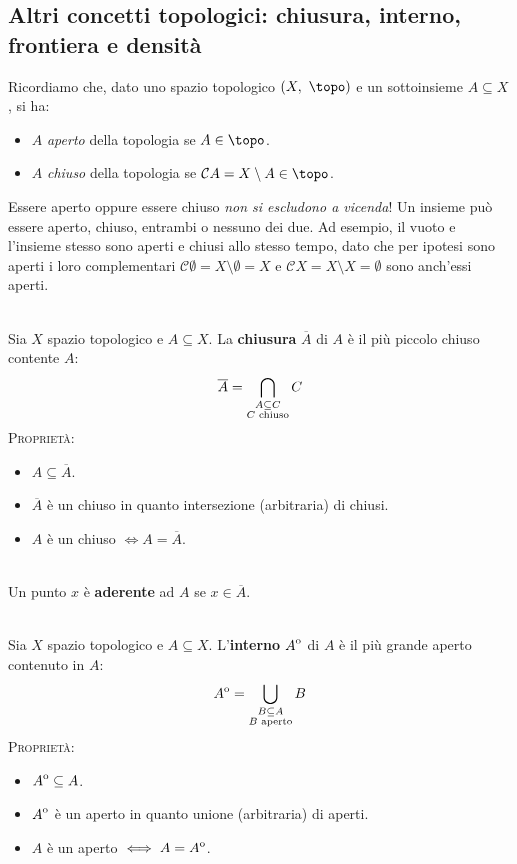 \subsection{Altri concetti topologici: chiusura, interno, frontiera e densità}
Ricordiamo che, dato uno spazio topologico $\left(X,\ \topo\right)$ e un sottoinsieme $A\subseteq X$, si ha:
\begin{itemize}
\item $A$ \textit{aperto} della topologia se $A\in\topo$.
\item $A$ \textit{chiuso} della topologia se $\mathcal{C}A=X\setminus A\in\topo$.
\end{itemize}
\begin{attention}
Essere aperto oppure essere chiuso \textit{non si escludono a vicenda}! Un insieme può essere aperto, chiuso, entrambi o nessuno dei due. Ad esempio, il vuoto e l'insieme stesso sono aperti e chiusi allo stesso tempo, dato che per ipotesi sono aperti i loro complementari $\mathcal{C}\emptyset = X\setminus \emptyset = X$ e $\mathcal{C}X = X\setminus X = \emptyset$ sono anch'essi aperti.
\end{attention}
\begin{define}[Chiusura.]~{}\\
Sia $X$ spazio topologico e $A\subseteq X$. La \textbf{chiusura} $\overline{A}$ di $A$ è il più piccolo chiuso contente $A$:
\begin{equation}
\overline{A}=\mathop{{\bigcap}}\displaylimits_{\substack{A\subseteq C\\C\text{ chiuso}}}C
\end{equation}
\textsc{Proprietà:}
\begin{itemize}
\item $A\subseteq \overline{A}$.
\item $\overline{A}$ è un chiuso in quanto intersezione (arbitraria) di chiusi.
\item $A$ è un chiuso $\iff A=\overline{A}$.
\end{itemize}
\vspace{-3mm}
\end{define}
\begin{define}~{}\\
Un punto $x$ è \textbf{aderente} ad $A$ se $x\in\overline{A}$.
\end{define}
\begin{define}[Interno.]~{}\\
Sia $X$ spazio topologico e $A\subseteq X$. L'\textbf{interno} ${\kern0ptA}^{\mathrm{o}}$ di $A$ è il più grande aperto contenuto in $A$:
\begin{equation}
	{\kern0ptA}^{\mathrm{o}}=\mathop{{\bigcup}}\displaylimits_{\substack{B\subseteq A\\B\text{ aperto}}}B
\end{equation}
\textsc{Proprietà:}
\begin{itemize}
	\item ${\kern0ptA}^{\mathrm{o}}\subseteq A$.
	\item ${\kern0ptA}^{\mathrm{o}}$ è un aperto in quanto unione (arbitraria) di aperti.
	\item $A$ è un aperto $\iff A={\kern0ptA}^{\mathrm{o}}$.
\end{itemize}
\vspace{-3mm}
\end{define}
